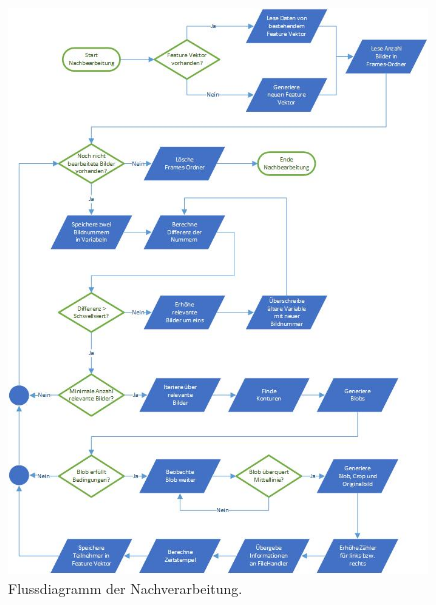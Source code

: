 \begin{figure}[H]
  \centering
  \includegraphics[width=0.99\textwidth]{Software/Fluss_Nachverarbeitung.jpg} 
  \caption{Flussdiagramm der Nachverarbeitung.}
  \label{bFlussNach}
\end{figure}

